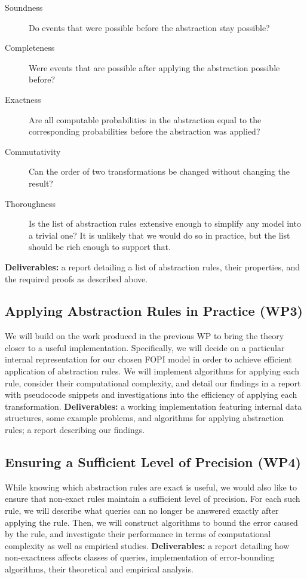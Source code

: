 \documentclass{article}
\begin{document}
\begin{description}
\item[Soundness] Do events that were possible before the abstraction stay
  possible?
\item[Completeness] Were events that are possible after applying the abstraction
  possible before?
\item[Exactness] Are all computable probabilities in the abstraction equal to
  the corresponding probabilities before the abstraction was applied?
\item[Commutativity] Can the order of two transformations be changed without
  changing the result?
\item[Thoroughness] Is the list of abstraction rules extensive enough to
  simplify any model into a trivial one? It is unlikely that we would do so in
  practice, but the list should be rich enough to support that.
\end{description}

\textbf{Deliverables:} a report detailing a list of abstraction rules, their
properties, and the required proofs as described above.

\subsection{Applying Abstraction Rules in Practice (WP3)}

We will build on the work produced in the previous WP to bring the theory closer
to a useful implementation. Specifically, we will decide on a particular
internal representation for our chosen FOPI model in order to achieve efficient
application of abstraction rules. We will implement algorithms for applying each
rule, consider their computational complexity, and detail our findings in a
report with pseudocode snippets and investigations into the efficiency of
applying each transformation. \textbf{Deliverables:} a working implementation
featuring internal data structures, some example problems, and algorithms for
applying abstraction rules; a report describing our findings.

\subsection{Ensuring a Sufficient Level of Precision (WP4)}

While knowing which abstraction rules are exact is useful, we would also
like to ensure that non-exact rules maintain a sufficient level of precision.
For each such rule, we will describe what queries can no longer be answered
exactly after applying the rule. Then, we will construct algorithms to bound the
error caused by the rule, and investigate their performance in terms of
computational complexity as well as empirical studies. \textbf{Deliverables:} a
report detailing how non-exactness affects classes of queries, implementation of
error-bounding algorithms, their theoretical and empirical analysis.
\end{document}
